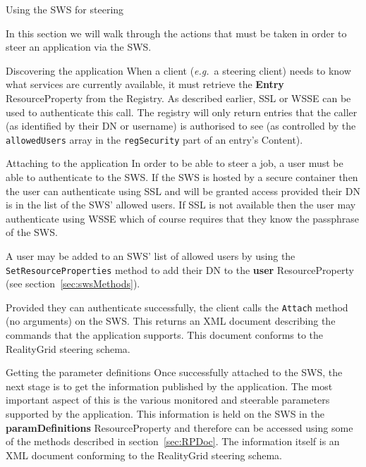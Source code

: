 \documentclass[a4paper]{article}
\begin{document}
\begin{section}{Using the SWS for steering}
\label{sec:sws_steering}

In this section we will walk through the actions that must be taken in
order to steer an application via the SWS.

\begin{subsection}{Discovering the application}
When a client ({\it e.g.}\ a steering client) needs to know what
services are currently available, it must retrieve the {\bf Entry}
ResourceProperty from the Registry.  As described earlier, SSL or WSSE
can be used to authenticate this call.  The registry will only return
entries that the caller (as identified by their DN or username) is
authorised to see (as controlled by the \texttt{allowedUsers} array in
the \texttt{regSecurity} part of an entry's Content).
\end{subsection}

\begin{subsection}{Attaching to the application}
In order to be able to steer a job, a user must be able to authenticate to the
SWS.  If the SWS is hosted by a secure container then the user can authenticate
using SSL and will be granted access provided their DN is in the list of the SWS' 
allowed users.  If SSL is not available then the user may authenticate using
WSSE which of course requires that they know the passphrase of the SWS.

A user may be added to an SWS' list of allowed users by using the 
\texttt{SetResourceProperties} method to add their DN to the {\bf user}
ResourceProperty (see section~\ref{sec:swsMethods}).

Provided they can authenticate successfully, the client calls the 
\texttt{Attach} method (no arguments) on the SWS.
This returns an XML document describing the commands that the application
supports.  This document conforms to the RealityGrid steering schema.
\end{subsection}

\begin{subsection}{Getting the parameter definitions}
Once successfully attached to the SWS, the next stage is to get the
information published by the application.  The most important aspect
of this is the various monitored and steerable parameters supported by
the application.  This information is held on the SWS in the {\bf
paramDefinitions} ResourceProperty and therefore can be accessed using
some of the methods described in section~\ref{sec:RPDoc}.  The
information itself is an XML document conforming to the RealityGrid
steering schema.
\end{subsection}


\end{section}
\end{document}
